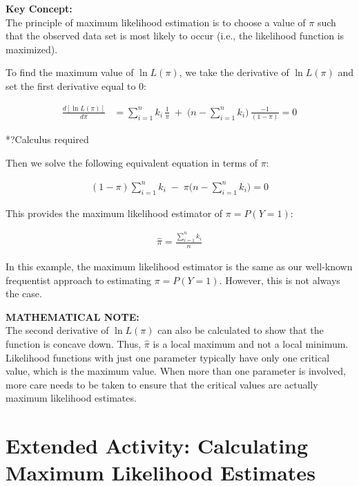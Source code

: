 \documentclass[
]{report}
\begin{document}
\textbf{Key Concept:}\\
The principle of maximum likelihood estimation is to choose a value of \(\pi\) such that the observed data set is most likely to occur (i.e., the likelihood function is maximized).\\
\normalsize

To find the maximum value of \(\ln L(\pi)\), we take the derivative of \(\ln L(\pi)\) and set the first derivative equal to 0:

\begin{align}
\frac{d[\ln L(\pi)]}{d\pi}
&= \sum_{i=1}^n k_i \,\frac{1}{\pi} \;+\;\bigl(n - \sum_{i=1}^n k_i\bigr)\,\frac{-1}{(1 - \pi)} = 0
\tag{7.29}
\end{align}

*?Calculus required

Then we solve the following equivalent equation in terms of \(\pi\):

\begin{align}
(1 - \pi)\sum_{i=1}^n k_i \;-\;\pi\bigl(n - \sum_{i=1}^n k_i\bigr) = 0
\tag{7.30}
\end{align}

This provides the maximum likelihood estimator of \(\pi = P(Y = 1)\):

\begin{align}
\displaystyle \hat{\pi} = \frac{\sum_{i=1}^n k_i}{n}
\tag{7.31}
\end{align}

In this example, the maximum likelihood estimator is the same as our well-known frequentist approach to estimating \(\pi = P(Y = 1)\). However, this is not always the case.

\large

\textbf{MATHEMATICAL NOTE:}\\
The second derivative of \(\ln L(\pi)\) can also be calculated to show that the function is concave down. Thus, \(\hat{\pi}\) is a local maximum and not a local minimum. Likelihood functions with just one parameter typically have only one critical value, which is the maximum value. When more than one parameter is involved, more care needs to be taken to ensure that the critical values are actually maximum likelihood estimates.\\
\normalsize

\section*{Extended Activity: Calculating Maximum Likelihood Estimates}\label{extended-activity-calculating-maximum-likelihood-estimates}
\end{document}
